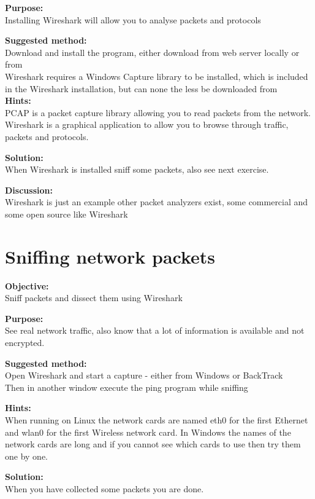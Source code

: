 \documentclass[a4paper,11pt,notitlepage]{report}
\begin{document}
{\bf Purpose:}\\
Installing Wireshark will allow you to analyse packets and protocols

{\bf Suggested method:}\\
Download and install the program, either download from web server locally or from \\
Wireshark requires a Windows Capture library to be installed, which is included in the
Wireshark installation, but can none the less be downloaded from\\

{\bf Hints:}\\
PCAP is a packet capture library allowing you to read packets from the network. Wireshark is a graphical application to allow you to browse through traffic, packets and protocols.

{\bf Solution:}\\
When Wireshark is installed sniff some packets, also see next exercise.

{\bf Discussion:}\\
Wireshark is just an example other packet analyzers exist, some commercial and some open source like Wireshark

\chapter{Sniffing network packets}
\label{ex:wireshark-sniff}

{\bf Objective:}\\
Sniff packets and dissect them using Wireshark

{\bf Purpose:}\\
See real network traffic, also know that a lot of information is available and not encrypted.

{\bf Suggested method:}\\
Open Wireshark and start a capture - either from Windows or BackTrack\\
Then in another window execute the ping program while sniffing

{\bf Hints:}\\
When running on Linux the network cards are named eth0 for the first Ethernet and wlan0 for the first Wireless network card. In Windows the names of the network cards are long and if you cannot see which cards to use then try them one by one.

{\bf Solution:}\\
When you have collected some packets you are done.
\end{document}
